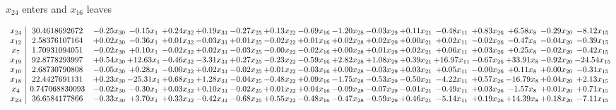 \documentclass[9pt]{article}
\begin{document}
 $ x_{24} $ enters and $ x_{16} $ leaves 

 \[\begin{array}{c| c c@{\hskip 2pt} c@{\hskip 2pt} c@{\hskip 2pt} c@{\hskip 2pt} c@{\hskip 2pt} c@{\hskip 2pt} c@{\hskip 2pt} c@{\hskip 2pt} c@{\hskip 2pt} c@{\hskip 2pt} c@{\hskip 2pt} c@{\hskip 2pt} c@{\hskip 2pt} c@{\hskip 2pt} c@{\hskip 2pt} }
 x_{24}   &  30.4618692672 & -0.25 x_{30} & -0.15 x_{1} & +  0.24 x_{32} & +  0.19 x_{31} & -0.27 x_{25} & +  0.13 x_{22} & -0.69 x_{16} & -1.20 x_{28} & -0.03 x_{29} & +  0.11 x_{21} & -0.48 x_{11} & +  0.83 x_{26} & +  6.58 x_{8} & -0.29 x_{20} & -8.12 x_{15}\\
 x_{12}   &  2.58376107164 & +  0.02 x_{30} & -0.36 x_{1} & +  0.01 x_{32} & -0.03 x_{31} & +  0.01 x_{25} & -0.02 x_{22} & +  0.01 x_{16} & +  0.02 x_{28} & +  0.02 x_{29} & +  0.00 x_{21} & +  0.02 x_{11} & -0.02 x_{26} & -0.47 x_{8} & -0.04 x_{20} & -0.39 x_{15}\\
 x_{7}   &  1.70931094051 & -0.02 x_{30} & +  0.10 x_{1} & -0.02 x_{32} & +  0.02 x_{31} & -0.03 x_{25} & -0.00 x_{22} & -0.02 x_{16} & +  0.00 x_{28} & +  0.01 x_{29} & +  0.02 x_{21} & +  0.06 x_{11} & +  0.03 x_{26} & +  0.25 x_{8} & -0.02 x_{20} & -0.42 x_{15}\\
 x_{19}   &  92.8778293997 & +  0.54 x_{30} & + 12.63 x_{1} & -0.46 x_{32} & -3.31 x_{31} & +  0.27 x_{25} & -0.23 x_{22} & -0.59 x_{16} & +  2.82 x_{28} & +  1.08 x_{29} & +  0.39 x_{21} & + 16.97 x_{11} & -0.67 x_{26} & + 33.91 x_{8} & -0.92 x_{20} & -24.54 x_{15}\\
 x_{10}   &  2.68730790808 & -0.05 x_{30} & +  0.28 x_{1} & -0.00 x_{32} & +  0.02 x_{31} & -0.02 x_{25} & +  0.01 x_{22} & -0.03 x_{16} & +  0.00 x_{28} & -0.03 x_{29} & +  0.03 x_{21} & +  0.05 x_{11} & -0.00 x_{26} & +  0.11 x_{8} & +  0.00 x_{20} & -0.31 x_{15}\\
 x_{18}   &  22.4427691131 & +  0.23 x_{30} & -25.31 x_{1} & +  0.68 x_{32} & +  1.28 x_{31} & -0.04 x_{25} & -0.48 x_{22} & +  0.09 x_{16} & -1.75 x_{28} & -0.53 x_{29} & -0.50 x_{21} & -4.22 x_{11} & +  0.57 x_{26} & -16.79 x_{8} & +  0.04 x_{20} & +  2.13 x_{15}\\
 x_{4}   &  0.747068830093 & -0.02 x_{30} & -0.30 x_{1} & +  0.03 x_{32} & +  0.10 x_{31} & -0.02 x_{25} & +  0.01 x_{22} & +  0.04 x_{16} & -0.09 x_{28} & -0.07 x_{29} & -0.01 x_{21} & -0.49 x_{11} & +  0.03 x_{26} & -1.57 x_{8} & +  0.01 x_{20} & +  0.71 x_{15}\\
 x_{23}   &  36.6584177866 & -0.33 x_{30} & +  3.70 x_{1} & +  0.33 x_{32} & -0.42 x_{31} & -0.68 x_{25} & +  0.55 x_{22} & -0.48 x_{16} & -0.47 x_{28} & -0.59 x_{29} & +  0.46 x_{21} & -5.14 x_{11} & +  0.19 x_{26} & + 14.39 x_{8} & +  0.18 x_{20} & -7.11 x_{15}\\

\end{array}\]
\end{document}
